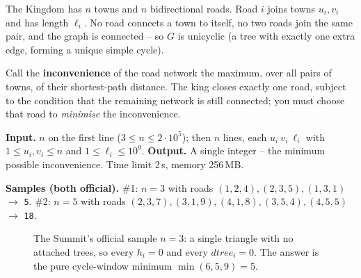 \begin{problemstatement}
The Kingdom has \(n\) towns and \(n\) bidirectional roads.  Road \(i\) joins towns
\(u_i,v_i\) and has length \(\ell_i\).  No road connects a town to itself, no two roads
join the same pair, and the graph is connected -- so \(G\) is unicyclic (a tree with
exactly one extra edge, forming a unique simple cycle).

Call the \textbf{inconvenience} of the road network the maximum, over all pairs of
towns, of their shortest-path distance.  The king closes exactly one road, subject
to the condition that the remaining network is still connected; you must choose
that road to \emph{minimise} the inconvenience.

\textbf{Input.} \(n\) on the first line (\(3\le n\le 2\cdot 10^{5}\)); then \(n\) lines,
each \(u_i\ v_i\ \ell_i\) with \(1\le u_i,v_i\le n\) and \(1\le \ell_i\le 10^{9}\).
\textbf{Output.} A single integer -- the minimum possible inconvenience.  Time limit
2\,s, memory 256\,MB.

\textbf{Samples (both official).}  \#1: \(n{=}3\) with roads
\((1,2,4), (2,3,5), (1,3,1)\) \(\to\) \texttt{5}.  \#2: \(n{=}5\) with roads
\((2,3,7), (3,1,9), (4,1,8), (3,5,4), (4,5,5)\) \(\to\) \texttt{18}.
\end{problemstatement}

\begin{figure}[H]
\centering
{}
\caption{The Summit's official sample \(n{=}3\): a single triangle with no attached
trees, so every \(h_i{=}0\) and every \(\mathit{dtree}_i{=}0\).  The answer is the pure
cycle-window minimum \(\min(6,5,9){=}5\).}
\label{fig:c31-summit}
\end{figure}

